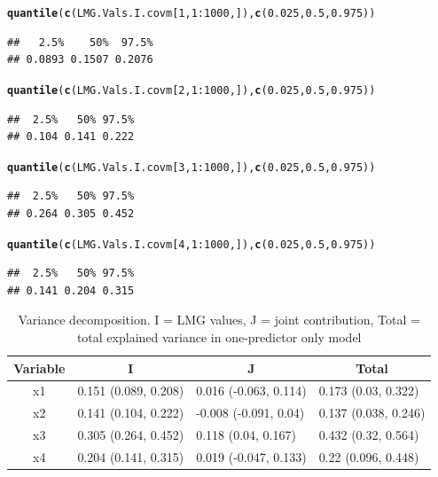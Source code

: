 \documentclass[11pt,a4paper,twoside]{book}\usepackage[]{graphicx}\usepackage[]{color}
\makeatletter
\newcommand{\hlnum}[1]{\textcolor[rgb]{0.686,0.059,0.569}{#1}}%
\newcommand{\hlopt}[1]{\textcolor[rgb]{0,0,0}{#1}}%
\newcommand{\hlstd}[1]{\textcolor[rgb]{0.345,0.345,0.345}{#1}}%
\newcommand{\hlkwd}[1]{\textcolor[rgb]{0.737,0.353,0.396}{\textbf{#1}}}%
\newenvironment{kframe}{%
 \def\at@end@of@kframe{}%
 \ifinner\ifhmode%
  \def\at@end@of@kframe{\end{minipage}}%
  \begin{minipage}{\columnwidth}%
 \fi\fi%
 \def\FrameCommand##1{\hskip\@totalleftmargin \hskip-\fboxsep
 \colorbox{shadecolor}{##1}\hskip-\fboxsep
     \hskip-\linewidth \hskip-\@totalleftmargin \hskip\columnwidth}%
 \MakeFramed {\advance\hsize-\width
   \@totalleftmargin\z@ \linewidth\hsize
   \@setminipage}}%
 {\par\unskip\endMakeFramed%
 \at@end@of@kframe}
\newenvironment{knitrout}{}{} %
\makeatother
\begin{document}
\begin{knitrout}
\begin{kframe}
\begin{alltt}
\hlkwd{quantile}\hlstd{(}\hlkwd{c}\hlstd{(LMG.Vals.I.covm[}\hlnum{1}\hlstd{,}\hlnum{1}\hlopt{:}\hlnum{1000}\hlstd{,]),} \hlkwd{c}\hlstd{(}\hlnum{0.025}\hlstd{,} \hlnum{0.5}\hlstd{,} \hlnum{0.975}\hlstd{))}
\end{alltt}
\begin{verbatim}
##   2.5%    50%  97.5% 
## 0.0893 0.1507 0.2076
\end{verbatim}
\begin{alltt}
\hlkwd{quantile}\hlstd{(}\hlkwd{c}\hlstd{(LMG.Vals.I.covm[}\hlnum{2}\hlstd{,}\hlnum{1}\hlopt{:}\hlnum{1000}\hlstd{,]),} \hlkwd{c}\hlstd{(}\hlnum{0.025}\hlstd{,} \hlnum{0.5}\hlstd{,} \hlnum{0.975}\hlstd{))}
\end{alltt}
\begin{verbatim}
##  2.5%   50% 97.5% 
## 0.104 0.141 0.222
\end{verbatim}
\begin{alltt}
\hlkwd{quantile}\hlstd{(}\hlkwd{c}\hlstd{(LMG.Vals.I.covm[}\hlnum{3}\hlstd{,}\hlnum{1}\hlopt{:}\hlnum{1000}\hlstd{,]),} \hlkwd{c}\hlstd{(}\hlnum{0.025}\hlstd{,} \hlnum{0.5}\hlstd{,} \hlnum{0.975}\hlstd{))}
\end{alltt}
\begin{verbatim}
##  2.5%   50% 97.5% 
## 0.264 0.305 0.452
\end{verbatim}
\begin{alltt}
\hlkwd{quantile}\hlstd{(}\hlkwd{c}\hlstd{(LMG.Vals.I.covm[}\hlnum{4}\hlstd{,}\hlnum{1}\hlopt{:}\hlnum{1000}\hlstd{,]),} \hlkwd{c}\hlstd{(}\hlnum{0.025}\hlstd{,} \hlnum{0.5}\hlstd{,} \hlnum{0.975}\hlstd{))}
\end{alltt}
\begin{verbatim}
##  2.5%   50% 97.5% 
## 0.141 0.204 0.315
\end{verbatim}
\end{kframe}
\end{knitrout}


\begin{table}[h]
\centering
\begin{tabular}{clll}
  \hline
  \multicolumn{1}{c}{\textbf{Variable}} & \multicolumn{1}{c}{\textbf{I}} &\multicolumn{1}{c}{\textbf{J}} & \multicolumn{1}{c}{\textbf{Total}} \\
  \hline
x1 & 0.151 (0.089, 0.208)  & 0.016 (-0.063, 0.114)   & 0.173 (0.03, 0.322)  \\ 
x2 & 0.141 (0.104, 0.222)  & -0.008 (-0.091, 0.04)   & 0.137 (0.038, 0.246)  \\ 
x3 & 0.305 (0.264, 0.452)  & 0.118 (0.04, 0.167)   & 0.432 (0.32, 0.564)  \\ 
x4 & 0.204 (0.141, 0.315)  & 0.019 (-0.047, 0.133)   & 0.22 (0.096, 0.448)  \\ 

   \hline
\end{tabular}
\caption{Variance decomposition. I = LMG values, J = joint contribution, Total = total explained variance in one-predictor only model}
\label{tbl:fundus.to.SLO3}
\end{table}
\end{document}
